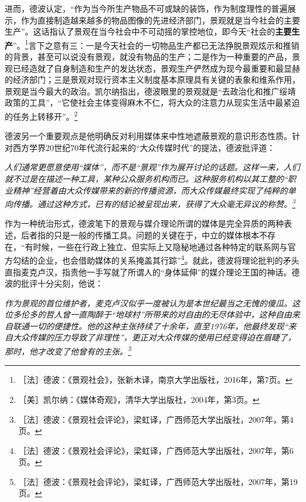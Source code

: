 \documentclass[fontset=fandol, a4paper, 12pt, openright]{ctexbook}
\renewenvironment{quote}
  {\list{}{\rightmargin\leftmargin}%
   \item\relax\small\itshape\color{darkgray}}
  {\endlist}
\begin{document}
进而，德波认定，“作为当今所生产物品不可或缺的装饰，作为制度理性的普遍展示，作为直接制造越来越多的物品图像的先进经济部门，景观就是当今社会的主要生产”。这话指认了景观在当今社会中不可动摇的掌控地位，即今天“社会的\textbf{主要生产}”。\footnote{［法］德波：《景观社会》，张新木译，南京大学出版社，2016年，第7页。}言下之意有三：一是今天社会的一切物品生产都已无法挣脱景观炫示和推销的背景，甚至可以说没有景观，就没有物品的生产；二是作为一种重要的产品，景观已经造就了自身制造和生产的发达状态，景观生产俨然成为现今最重要和最显赫的经济部门；三是景观对现行资本主义制度基本原理具有关键的表象和维系作用，景观是当今最大的政治。凯尔纳指出，德波眼里的景观就是“去政治化和推广绥靖政策的工具”，“它使社会主体变得麻木不仁，将大众的注意力从现实生活中最紧迫的任务上转移开”。\footnote{［美］凯尔纳：《媒体奇观》，清华大学出版社，2004年，第3页。}

德波另一个重要观点是他明确反对利用媒体来中性地遮蔽景观的意识形态性质。针对西方学界20世纪70年代流行起来的“大众传媒时代”的提法，德波批评道：

\begin{quote}
人们通常更愿意使用“媒体”，而不是“景观”作为展开讨论的话题。这样一来，人们就不过是在描述一种工具，某种公众服务机构而已。这种服务机构以其工整的“职业精神”经营着由大众传媒带来的新的传播资源，而大众传媒最终实现了纯粹的单向传播。通过这种方式，已有的结论被呈现出来，获得了大众毫无异议的称赞。\footnote{［法］德波：《景观社会评论》，梁虹译，广西师范大学出版社，2007年，第4页。}
\end{quote}

作为一种统治形式，德波笔下的景观与媒介理论所谓的媒体是完全异质的两种表述，后者指的只是一般的传播工具。问题的关键在于，中立的媒体根本不存在，“有时候，一些在行政上独立、但实际上又隐秘地通过各种特定的联系网与官方勾结的企业，也会借助媒体的关系掩盖其行踪”\footnote{［法］德波：《景观社会评论》，梁虹译，广西师范大学出版社，2007年，第6页。}。就此，德波将理论批判的矛头直指麦克卢汉，指责他一手写就了所谓人的“身体延伸”的媒介理论王国的神话。德波的批评十分尖刻，他说：

\begin{quote}
作为景观的首位维护者，麦克卢汉似乎一度被认为是本世纪最当之无愧的傻瓜。这位多伦多的哲人曾一直陶醉于“地球村”所带来的对自由的无尽体验中，这种自由来自联通一切的便捷性。他的这种主张持续了十余年，直至1976年，他最终发现“来自大众传媒的压力导致了非理性”，更正对大众传媒的使用已经变得迫在眉睫了，那时，他才改变了他曾有的主张。\footnote{［法］德波：《景观社会评论》，梁虹译，广西师范大学出版社，2007年，第19页。}
\end{quote}
\end{document}
